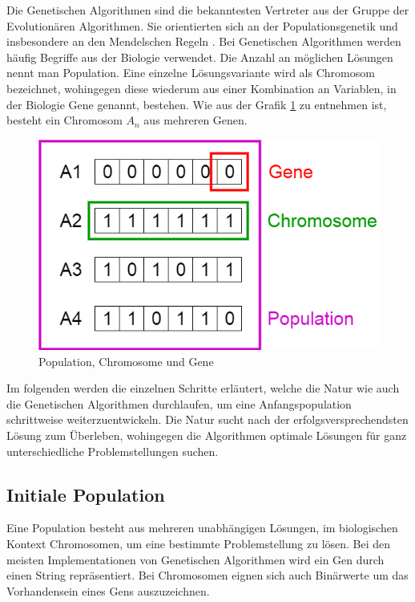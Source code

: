 Die Genetischen Algorithmen sind die bekanntesten Vertreter aus der Gruppe der Evolutionären
Algorithmen. Sie orientierten sich an der Populationsgenetik und insbesondere an den Mendelschen
Regeln \cite{Mcc00}.
Bei Genetischen Algorithmen werden häufig Begriffe aus der Biologie verwendet. Die Anzahl an
möglichen Lösungen nennt man Population. Eine einzelne Lösungsvariante wird als Chromosom
bezeichnet, wohingegen diese wiederum aus einer Kombination an Variablen, in der Biologie Gene
genannt, bestehen. Wie aus der Grafik \ref{fig:genetics} zu entnehmen ist, besteht ein Chromosom
$A_n$ aus mehreren Genen.
\\
\begin{figure}[h!]
  \centering
  \includegraphics[scale=0.5]{resources/genetic_algorithms.png}
  \caption{Population, Chromosome und Gene \cite{Mal17}}
  \label{fig:genetics}
\end{figure}

Im folgenden werden die einzelnen Schritte erläutert, welche die Natur wie auch die Genetischen
Algorithmen durchlaufen, um eine Anfangspopulation schrittweise weiterzuentwickeln. Die Natur
sucht nach der erfolgsversprechendsten Lösung zum Überleben, wohingegen die Algorithmen
optimale Lösungen für ganz unterschiedliche Problemstellungen suchen. \cite{Mal17}

\subsection{Initiale Population}
Eine Population besteht aus mehreren unabhängigen Lösungen, im biologischen Kontext Chromosomen,
um eine bestimmte Problemstellung zu lösen. Bei den meisten Implementationen von Genetischen
Algorithmen wird ein Gen durch einen String repräsentiert. Bei Chromosomen eignen sich auch
Binärwerte um das Vorhandensein eines Gens auszuzeichnen.

